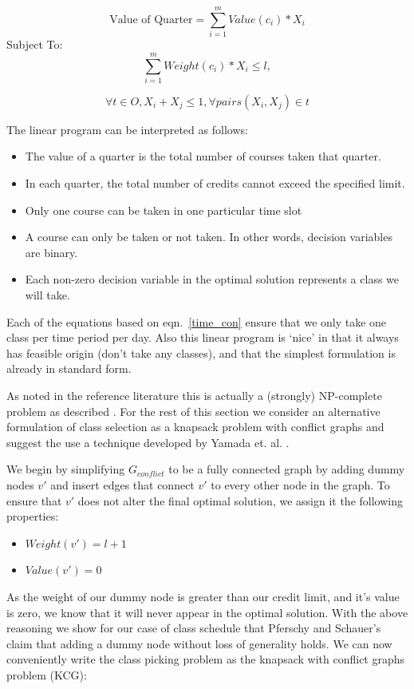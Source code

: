 \documentclass[11pt]{article} %
\begin{document}
\begin{equation}
    \text{Value of Quarter} = \sum_{i=1}^m Value(c_i) * X_i
    \label{qtr_val}
\end{equation}
Subject To:
\begin{equation}
    \sum_{i=1}^m Weight(c_i) * X_i \leq l, 
    \label{weight_lim}
\end{equation}

\begin{equation}
    \forall t \in O,X_i+X_j \leq 1, \forall pairs (X_i,X_j) \in t
    \label{time_con}
\end{equation}

The linear program
can be interpreted as follows: \begin{itemize} \item The value of a quarter is
the total number of courses taken that quarter.  \item In each quarter, the
total number of credits cannot exceed the specified limit.  \item Only one
course can be taken in one particular time slot \item A course can only be taken
or not taken. In other words, decision variables are binary.  \item Each
non-zero decision variable in the optimal solution represents a class we will
take.  \end{itemize}

Each of the equations based on eqn.~\ref{time_con} ensure that we only take one class per 
time period per day. Also this linear program is ‘nice’ in that it always has 
feasible origin (don’t take any classes), and that the simplest formulation 
is already in standard form.

As noted in the reference literature this is actually a (strongly) NP-complete
problem as described \cite{pferschy:kcg}. For the rest of this section we
consider an alternative formulation of class selection as a knapsack problem
with conflict graphs and suggest the use a technique developed by Yamada et. al.
\cite{yamada:heuristic}.

We begin by simplifying $G_{conflict}$ to be a fully connected graph by adding
dummy nodes $v'$ and insert edges that connect $v'$ to every other node in the
graph. To ensure that $v'$ does not alter the final optimal solution, we assign
it the following properties: \begin{itemize} \item $Weight(v') = l+1$ \item
$Value(v') = 0$ \end{itemize} As the weight of our dummy node is greater than
our credit limit, and it's value is zero, we know that it will never appear in
the optimal solution. With the above reasoning we show for our case of class
schedule that Pferschy and Schauer's \cite{pferschy:kcg} claim that adding
a dummy node without loss of generality holds. We can now conveniently write the
class picking problem as the knapsack with conflict graphs problem (KCG): 
\end{document}
